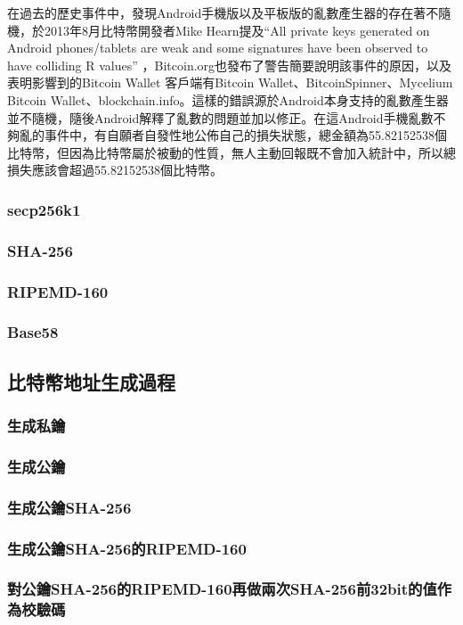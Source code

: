 		在過去的歷史事件中，發現Android手機版以及平板版的亂數產生器的存在著不隨機，於2013年8月比特幣開發者Mike Hearn提及“All private keys generated on Android phones/tablets are weak and some signatures have been observed to have colliding R values” \parencite{SomeSecureRandomThoughts}，Bitcoin.org也發布了警告\parencite{AndroidSecurityVulnerability}簡要說明該事件的原因，以及表明影響到的Bitcoin Wallet 客戶端有Bitcoin Wallet、BitcoinSpinner、Mycelium Bitcoin Wallet、blockchain.info。這樣的錯誤源於Android本身支持的亂數產生器並不隨機，隨後Android解釋了亂數的問題並加以修正。在這Android手機亂數不夠亂的事件中，有自願者自發性地公佈自己的損失狀態，總金額為55.82152538個比特幣\parencite{Badsignaturesleading}，但因為比特幣屬於被動的性質，無人主動回報既不會加入統計中，所以總損失應該會超過55.82152538個比特幣。

		\subsubsection{secp256k1}
		\subsubsection{SHA-256}
		\subsubsection{RIPEMD-160}
		\subsubsection{Base58}

	\subsection{比特幣地址生成過程}
		\subsubsection{生成私鑰}
		\subsubsection{生成公鑰}
		\subsubsection{生成公鑰SHA-256}
		\subsubsection{生成公鑰SHA-256的RIPEMD-160}
		\subsubsection{對公鑰SHA-256的RIPEMD-160再做兩次SHA-256前32bit的值作為校驗碼}
